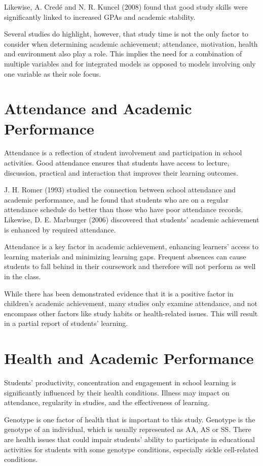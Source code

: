 \documentclass[12pt]{report}
\begin{document}
	Likewise, A. Credé and N. R. Kuncel (2008) found that good study skills were significantly linked to increased GPAs and academic stability.
	
	Several studies do highlight, however, that study time is not the only factor to consider when determining academic achievement; attendance, motivation, health and environment also play a role. This implies the need for a combination of multiple variables and for integrated models as opposed to models involving only one variable as their sole focus.
	\section{Attendance and Academic Performance}
	Attendance is a reflection of student involvement and participation in school activities. Good attendance ensures that students have access to lecture, discussion, practical and interaction that improves their learning outcomes.
	
	J. H. Romer (1993) studied the connection between school attendance and academic performance, and he found that students who are on a regular attendance schedule do better than those who have poor attendance records. Likewise, D. E. Marburger (2006) discovered that students' academic achievement is enhanced by required attendance.
	
	Attendance is a key factor in academic achievement, enhancing learners' access to learning materials and minimizing learning gaps. Frequent absences can cause students to fall behind in their coursework and therefore will not perform as well in the class.
	
	While there has been demonstrated evidence that it is a positive factor in children's academic achievement, many studies only examine attendance, and not encompass other factors like study habits or health-related issues. This will result in a partial report of students' learning.
	\section{Health and Academic Performance}
	Students' productivity, concentration and engagement in school learning is significantly influenced by their health conditions. Illness may impact on attendance, regularity in studies, and the effectiveness of learning.
	
	Genotype is one factor of health that is important to this study. Genotype is the genotype of an individual, which is usually represented as AA, AS or SS. There are health issues that could impair students' ability to participate in educational activities for students with some genotype conditions, especially sickle cell-related conditions.
	
\end{document}
